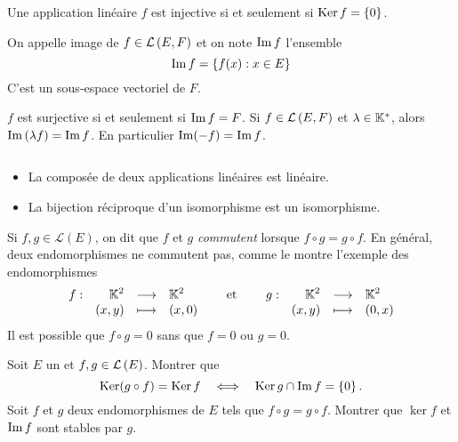 \documentclass{magnoliaold}
\begin{document}


\begin{proposition}[utile=3]
Une application linéaire $f$ est injective si et seulement si
\mbox{$\mathop{\rm Ker} f=\left\{0\right\}$}.
\end{proposition}

\begin{definition}[utile=-3]
On appelle image de $f\in\mathcal{L}\left(E,F\right)$ et on note $\operatorname{Im} f$ l'ensemble
\[\operatorname{Im} f=\left\{f(x) : x\in E\right\}\]
C'est un sous-espace vectoriel de $F$.
\end{definition}

\begin{remarques}
\remarque[utile=-3] $f$ est surjective si et seulement si $\operatorname{Im} f=F$.
\remarque[utile=1] Si $f\in\mathcal{L}\left(E,F\right)$ et $\lambda\in\mathbb{K}^*$, alors $\operatorname{Im}\left(\lambda f\right)=\operatorname{Im} f$. En particulier
  $\operatorname{Im}(-f)=\operatorname{Im} f$.
\end{remarques}


\begin{proposition}[utile=-3]
$\quad$
\begin{itemize}
\item La composée de deux applications linéaires est linéaire.
\item La bijection réciproque d'un isomorphisme est un isomorphisme.
\end{itemize}
\end{proposition}

\begin{remarques}
\remarque Si $f,g\in\mathcal{L}(E)$, on dit que $f$ et $g$ \emph{commutent} lorsque $f\circ g=g\circ f$.
  En général, deux endomorphismes ne commutent pas, comme le montre l'exemple des endomorphismes
  \[\begin{array}[t]{lrcl} \displaystyle{f} : & \displaystyle{\ensuremath{\mathbb{K}}^2} & \longrightarrow & \displaystyle{\ensuremath{\mathbb{K}}^2} \\ & \displaystyle{(x,y)} & \longmapsto & \displaystyle{(x, 0)} \end{array} \quad\quad\!\text{et}\quad\!\quad
    \begin{array}[t]{lrcl} \displaystyle{g} : & \displaystyle{\ensuremath{\mathbb{K}}^2} & \longrightarrow & \displaystyle{\ensuremath{\mathbb{K}}^2} \\ & \displaystyle{(x,y)} & \longmapsto & \displaystyle{(0,x)} \end{array}\]
\remarque Il est possible que $f\circ g=0$ sans que $f=0$ ou $g=0$.
\end{remarques}

\begin{exos}
\exo Soit $E$ un \Kev et $f,g\in\mathcal{L}\left(E\right)$. Montrer que
  \[\mathop{\rm Ker}(g\circ f)=\mathop{\rm Ker} f \quad\Longleftrightarrow\quad \mathop{\rm Ker} g\cap\operatorname{Im} f=\left\{0\right\}.\]
\exo Soit $f$ et $g$ deux endomorphismes de $E$ tels que
  $f\circ g=g\circ f$. Montrer que $\ker f$ et $\operatorname{Im} f$ sont stables par $g$.
\end{exos}
\end{document}
